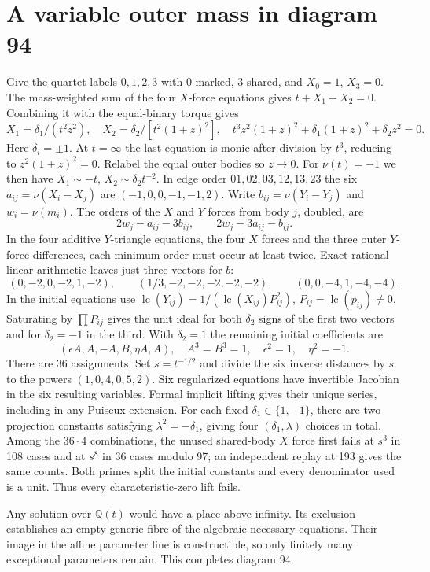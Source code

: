 \documentclass[11pt]{article}
\newcommand{\Q}{\mathbb Q}
\begin{document}
\section{A variable outer mass in diagram 94}
Give the quartet labels $0,1,2,3$ with $0$ marked, $3$ shared, and $X_0=1$, $X_3=0$. The mass-weighted sum of the four $X$-force equations gives $t+X_1+X_2=0$. Combining it with the equal-binary torque gives
\[
 X_1=\delta_1/(t^2z^2),\quad X_2=\delta_2/[t^2(1+z)^2],\quad
 t^3z^2(1+z)^2+\delta_1(1+z)^2+\delta_2z^2=0 .
\]
Here $\delta_i=\pm1$. At $t=\infty$ the last equation is monic after division by $t^3$, reducing to $z^2(1+z)^2=0$. Relabel the equal outer bodies so $z\to0$. For $\nu(t)=-1$ we then have $X_1\sim-t$, $X_2\sim\delta_2t^{-2}$. In edge order $01,02,03,12,13,23$ the six $a_{ij}=\nu(X_i-X_j)$ are $(-1,0,0,-1,-1,2)$. Write $b_{ij}=\nu(Y_i-Y_j)$ and $w_i=\nu(m_i)$. The orders of the $X$ and $Y$ forces from body $j$, doubled, are
\[
 2w_j-a_{ij}-3b_{ij},\qquad 2w_j-3a_{ij}-b_{ij}.
\]
In the four additive $Y$-triangle equations, the four $X$ forces and the three outer $Y$-force differences, each minimum order must occur at least twice. Exact rational linear arithmetic leaves just three vectors for $b$:
\[
 (0,-2,0,-2,1,-2),\qquad (1/3,-2,-2,-2,-2,-2),\qquad
 (0,0,-4,1,-4,-4).
\]
In the initial equations use $\operatorname{lc}(Y_{ij})=1/(\operatorname{lc}(X_{ij})P_{ij}^2)$, $P_{ij}=\operatorname{lc}(p_{ij})\ne0$. Saturating by $\prod P_{ij}$ gives the unit ideal for both $\delta_2$ signs of the first two vectors and for $\delta_2=-1$ in the third. With $\delta_2=1$ the remaining initial coefficients are
\[
 (\epsilon A,A,-A,B,\eta A,A),\quad A^3=B^3=1,\quad \epsilon^2=1,\quad\eta^2=-1 .
\]
There are 36 assignments. Set $s=t^{-1/2}$ and divide the six inverse distances by $s$ to the powers $(1,0,4,0,5,2)$. Six regularized equations have invertible Jacobian in the six resulting variables. Formal implicit lifting gives their unique series, including in any Puiseux extension. For each fixed $\delta_1\in\{1,-1\}$, there are two projection constants satisfying $\lambda^2=-\delta_1$, giving four $(\delta_1,\lambda)$ choices in total. Among the $36\cdot4$ combinations, the unused shared-body $X$ force first fails at $s^3$ in 108 cases and at $s^8$ in 36 cases modulo 97; an independent replay at 193 gives the same counts. Both primes split the initial constants and every denominator used is a unit. Thus every characteristic-zero lift fails.

Any solution over $\overline{\Q(t)}$ would have a place above infinity. Its exclusion establishes an empty generic fibre of the algebraic necessary equations. Their image in the affine parameter line is constructible, so only finitely many exceptional parameters remain. This completes diagram 94.
\end{document}
